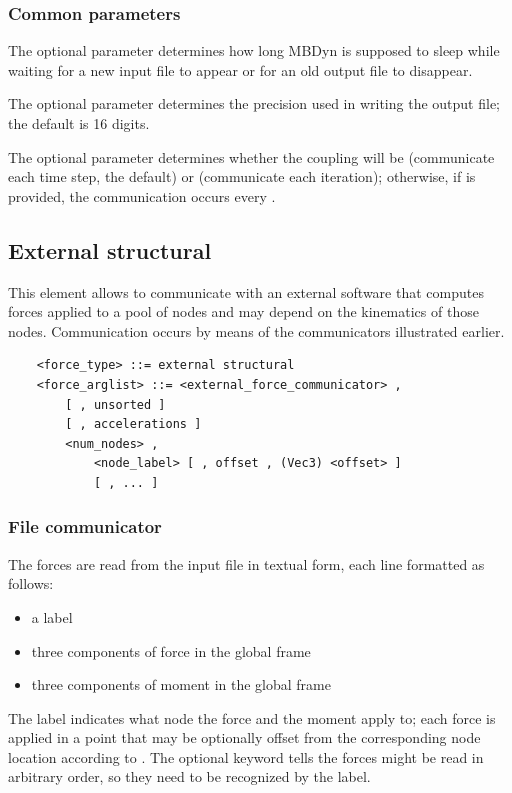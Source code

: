 \subsubsection{Common parameters}
The optional parameter  determines how long MBDyn
is supposed to sleep while waiting for a new input file to appear
or for an old output file to disappear.

The optional parameter  determines the precision
used in writing the output file; the default is 16 digits.

The optional parameter  determines whether the coupling
will be  (communicate each time step, the default) or
 (communicate each iteration); otherwise, if 
is provided, the communication occurs every .




\subsection{External structural}
This element allows to communicate with an external software that computes
forces applied to a pool of nodes and may depend on the kinematics of those
nodes.
Communication occurs by means of the communicators illustrated earlier.
\begin{verbatim}
    <force_type> ::= external structural
    <force_arglist> ::= <external_force_communicator> ,
        [ , unsorted ]
        [ , accelerations ]
        <num_nodes> ,
            <node_label> [ , offset , (Vec3) <offset> ]
            [ , ... ]
\end{verbatim}

\subsubsection{File communicator}
The forces are read from the input file in textual form,
each line formatted as follows:
\begin{itemize}
\item a label
\item three components of force in the global frame
\item three components of moment in the global frame
\end{itemize}
The label indicates what node the force and the moment apply to; 
each force is applied in a point that may be optionally offset 
from the corresponding node location according to .
The optional keyword  tells the forces might be
read in arbitrary order, so they need to be recognized by the label.

